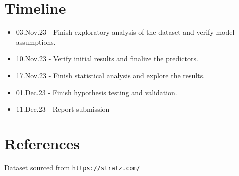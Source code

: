 \documentclass[12pt]{scrreprt}
\begin{document}
\section*{Timeline}
\begin{itemize}
    \item 03.Nov.23 - Finish exploratory analysis of the dataset and verify model assumptions.
    \item 10.Nov.23 - Verify initial results and finalize the predictors.
    \item 17.Nov.23 - Finish statistical analysis and explore the results.
    \item 01.Dec.23 - Finish hypothesis testing and validation.
    \item 11.Dec.23 - Report submission
\end{itemize}

\section*{References}
Dataset sourced from \texttt{https://stratz.com/}
\end{document}
